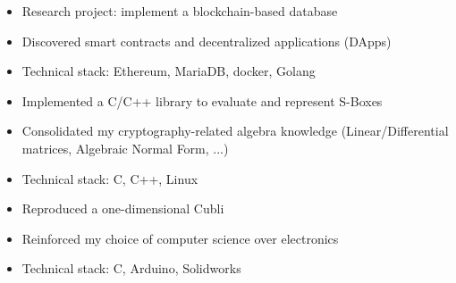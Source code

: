 \documentclass[10pt,a4paper,ragged2e,withhyper]{altacv}
\begin{document}
\begin{paracol}{2}
\divider

\begin{itemize}
  \item Research project: implement a blockchain-based database
  \item Discovered smart contracts and decentralized applications (DApps)
  \item Technical stack: Ethereum, MariaDB, docker, Golang
\end{itemize}

%

\divider

\begin{itemize}
  \item Implemented a C/C++ library to evaluate and represent S-Boxes
  \item Consolidated my cryptography-related algebra knowledge (Linear/Differential matrices, Algebraic Normal Form, ...)
  \item Technical stack: C, C++, Linux
\end{itemize}

\divider

\begin{itemize}
  \item Reproduced a one-dimensional Cubli
  \item Reinforced my choice of computer science over electronics
  \item Technical stack: C, Arduino, Solidworks
\end{itemize}


\medskip

%



\end{paracol}
\end{document}
